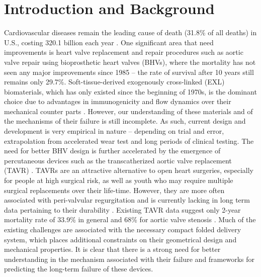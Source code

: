\section{Introduction and Background}

    Cardiovascular diseases remain the leading cause of death (31.8\% of all deaths) in U.S., costing 320.1 billion each year \cite{mozaffarian_heart_2016}. One significant area that need improvements is heart valve replacement and repair procedures such as aortic valve repair using bioprosthetic heart valves (BHVs), where the mortality has not seen any major improvements since 1985 – the rate of survival after 10 years still remains only 29.7\%. Soft-tissue-derived exogenously cross-linked (EXL) biomaterials, which has only existed since the beginning of 1970s, is the dominant choice due to advantages in immunogenicity and flow dynamics over their mechanical counter parts 
    \cite{starr_artificial_2007}. However, our understanding of these materials and of the mechanisms of their failure is still incomplete. As such, current design and development is very empirical in nature – depending on trial and error, extrapolation from accelerated wear test and long periods of clinical testing. The need for better BHV design is further accelerated by the emergence of percutaneous devices such as the transcatherized aortic valve replacement (TAVR) \cite{bonow_accaha_2006}\cite{guidoin_marvel_2010}. TAVRs are an attractive alternative to open heart surgeries, especially for people at high surgical risk, as well as youth who may require multiple surgical replacements over their life-time. However, they are more often associated with peri-valvular regurgitation and is currently lacking in long term data pertaining to their durability \cite{guidoin_marvel_2010}. Existing TAVR data suggest only 2-year mortality rate of 33.9\% 
    \cite{kodali_two_2012} in general and 68\%
    for aortic valve stenosis \cite{makkar_transcatheter_2012}. Much of the existing challenges are associated with the necessary compact folded delivery system, which places additional constraints on their geometrical design and mechanical properties. It is clear that there is a strong need for better understanding in the mechanism associated with their failure and frameworks for predicting the long-term failure of these devices.
        
    

    
    
    
    
    
    
